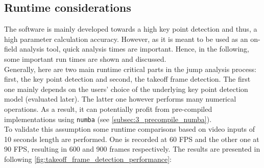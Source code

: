 \subsection{Runtime considerations}\label{subsec:4_runtime_performance}
The software is mainly developed towards a high key point detection and
thus, a high parameter calculation accuracy.
However, as it is meant to be used as an on-field analysis tool, quick
analysis times are important.
Hence, in the following, some important run times are shown and discussed.\\
Generally, here are two main runtime critical parts in the jump analysis
process: first, the key point detection and second, the takeoff frame
detection.
The first one mainly depends on the users' choice of the underlying key point
detection model (evaluated later).
The latter one however performs many numerical operations.
As a result, it can potentially profit from pre-compiled implementations
using \texttt{numba} (see \autoref{subsec:3_precompile_numba}).\\
To validate this assumption some runtime comparisons based on video inputs of
10 seconds length are performed.
One is recorded at 60 \ac{FPS} and the other one at 90 \ac{FPS},
resulting in 600 and 900 frames respectively.
The results are presented in following
\autoref*{fig:takeoff_frame_detection_performance}:
